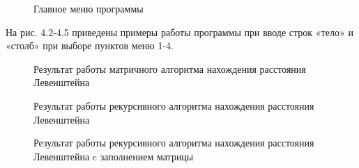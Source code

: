\documentclass[12pt]{report}
\begin{document}
\begin{figure}[h]
	\caption{Главное меню программы}
	\label{figure:image}
\end{figure} 

На рис. 4.2-4.5 приведены примеры работы программы при вводе строк «тело» и «столб» при выборе пунктов меню 1-4.

\begin{figure}[h]
	\caption{Результат работы матричного алгоритма нахождения расстояния Левенштейна}
	\label{figure:image}
\end{figure} 

\begin{figure}[h]
	\caption{Результат работы рекурсивного алгоритма нахождения расстояния Левенштейна}
	\label{figure:image}
\end{figure} 

\newpage
\begin{figure}[h]
	\caption{Результат работы рекурсивного алгоритма нахождения расстояния Левенштейна c заполнением матрицы}
	\label{figure:image}
\end{figure} 
\end{document}
